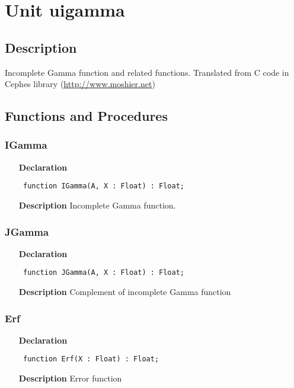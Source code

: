 \documentclass[12pt,a4paper,oneside]{report}
\newcommand{\declarationitem}[1]{\textbf{#1}}
\newcommand{\descriptiontitle}[1]{\textbf{#1}}
\newcommand{\code}[1]{\texttt{#1}}
\begin{document}
\section{Unit uigamma}
\label{uigamma}
\subsection{Description}
Incomplete Gamma function and related functions. Translated from C code in Cephes library (\href{http://www.moshier.net}{http://www.moshier.net}) \subsection{Functions and Procedures}
\subsubsection{IGamma}
\label{uigamma-IGamma}
\begin{itemize}\item[\declarationitem{Declaration}\hfill]
	\begin{flushleft}
		\code{
			function IGamma(A, X : Float) : Float;}
		
	\end{flushleft}
	
	\par
	\item[\descriptiontitle{Description}]
	Incomplete Gamma function.
	
\end{itemize}
\subsubsection{JGamma}
\label{uigamma-JGamma}
\begin{itemize}\item[\declarationitem{Declaration}\hfill]
	\begin{flushleft}
		\code{
			function JGamma(A, X : Float) : Float;}
		
	\end{flushleft}
	
	\par
	\item[\descriptiontitle{Description}]
	Complement of incomplete Gamma function
	
\end{itemize}
\subsubsection{Erf}
\label{uigamma-Erf}
\begin{itemize}\item[\declarationitem{Declaration}\hfill]
	\begin{flushleft}
		\code{
			function Erf(X : Float) : Float;}
		
	\end{flushleft}
	
	\par
	\item[\descriptiontitle{Description}]
	Error function
	
\end{itemize}
\end{document}
